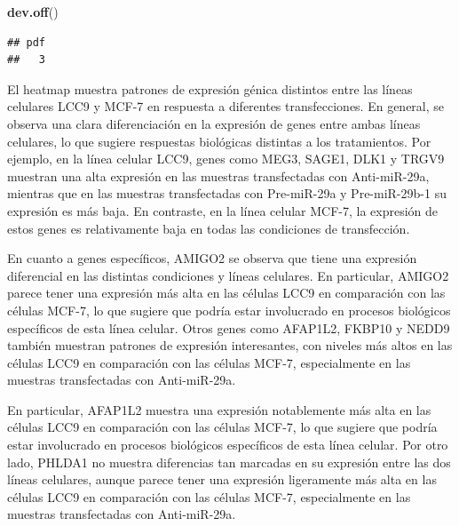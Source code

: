 \documentclass[
]{article}
\newenvironment{Shaded}{\begin{snugshade}}{\end{snugshade}}
\newcommand{\CommentTok}[1]{\textcolor[rgb]{0.56,0.35,0.01}{\textit{#1}}}
\newcommand{\DocumentationTok}[1]{\textcolor[rgb]{0.56,0.35,0.01}{\textbf{\textit{#1}}}}
\newcommand{\FunctionTok}[1]{\textcolor[rgb]{0.13,0.29,0.53}{\textbf{#1}}}
\newcommand{\NormalTok}[1]{#1}
\newcommand{\OtherTok}[1]{\textcolor[rgb]{0.56,0.35,0.01}{#1}}
\newcommand{\SpecialCharTok}[1]{\textcolor[rgb]{0.81,0.36,0.00}{\textbf{#1}}}
\newcommand{\StringTok}[1]{\textcolor[rgb]{0.31,0.60,0.02}{#1}}
\begin{document}
\begin{Shaded}
\begin{Highlighting}[]
\FunctionTok{dev.off}\NormalTok{()}
\end{Highlighting}
\end{Shaded}

\begin{verbatim}
## pdf 
##   3
\end{verbatim}

El heatmap muestra patrones de expresión génica distintos entre las
líneas celulares LCC9 y MCF-7 en respuesta a diferentes transfecciones.
En general, se observa una clara diferenciación en la expresión de genes
entre ambas líneas celulares, lo que sugiere respuestas biológicas
distintas a los tratamientos. Por ejemplo, en la línea celular LCC9,
genes como MEG3, SAGE1, DLK1 y TRGV9 muestran una alta expresión en las
muestras transfectadas con Anti-miR-29a, mientras que en las muestras
transfectadas con Pre-miR-29a y Pre-miR-29b-1 su expresión es más baja.
En contraste, en la línea celular MCF-7, la expresión de estos genes es
relativamente baja en todas las condiciones de transfección.

En cuanto a genes específicos, AMIGO2 se observa que tiene una expresión
diferencial en las distintas condiciones y líneas celulares. En
particular, AMIGO2 parece tener una expresión más alta en las células
LCC9 en comparación con las células MCF-7, lo que sugiere que podría
estar involucrado en procesos biológicos específicos de esta línea
celular. Otros genes como AFAP1L2, FKBP10 y NEDD9 también muestran
patrones de expresión interesantes, con niveles más altos en las células
LCC9 en comparación con las células MCF-7, especialmente en las muestras
transfectadas con Anti-miR-29a.

En particular, AFAP1L2 muestra una expresión notablemente más alta en
las células LCC9 en comparación con las células MCF-7, lo que sugiere
que podría estar involucrado en procesos biológicos específicos de esta
línea celular. Por otro lado, PHLDA1 no muestra diferencias tan marcadas
en su expresión entre las dos líneas celulares, aunque parece tener una
expresión ligeramente más alta en las células LCC9 en comparación con
las células MCF-7, especialmente en las muestras transfectadas con
Anti-miR-29a.

\begin{Shaded}
\end{Shaded}
\end{document}

